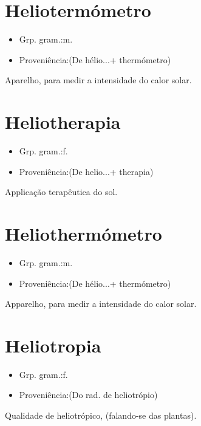 \documentclass{article}
\begin{document}
\section{Heliotermómetro}
\begin{itemize}
\item {Grp. gram.:m.}
\end{itemize}
\begin{itemize}
\item {Proveniência:(De \textunderscore hélio...\textunderscore  + \textunderscore thermómetro\textunderscore )}
\end{itemize}
Aparelho, para medir a intensidade do calor solar.
\section{Heliotherapia}
\begin{itemize}
\item {Grp. gram.:f.}
\end{itemize}
\begin{itemize}
\item {Proveniência:(De \textunderscore helio...\textunderscore  + \textunderscore therapia\textunderscore )}
\end{itemize}
Applicação terapêutica do sol.
\section{Heliothermómetro}
\begin{itemize}
\item {Grp. gram.:m.}
\end{itemize}
\begin{itemize}
\item {Proveniência:(De \textunderscore hélio...\textunderscore  + \textunderscore thermómetro\textunderscore )}
\end{itemize}
Apparelho, para medir a intensidade do calor solar.
\section{Heliotropia}
\begin{itemize}
\item {Grp. gram.:f.}
\end{itemize}
\begin{itemize}
\item {Proveniência:(Do rad. de \textunderscore heliotrópio\textunderscore )}
\end{itemize}
Qualidade de heliotrópico, (falando-se das plantas).
\end{document}
